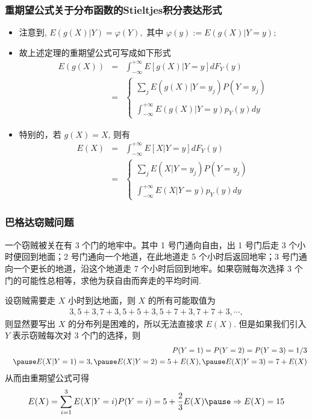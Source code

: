 \documentclass[Prob-All.tex]{subfiles}
\begin{document}
\begin{frame}
	\frametitle{重期望公式关于分布函数的Stieltjes积分表达形式}
	\begin{itemize}[<+-|alert@+>]
		\item 注意到, $E(g(X)|Y)=\varphi(Y),$ 其中 $\varphi(y):=E(g(X)|Y=y)$;
		\item 故上述定理的重期望公式可写成如下形式
		\begin{eqnarray*}
			E(g(X))&=&\int_{-\infty}^{+\infty}E[g(X)|Y=y]dF_Y(y)\\
			&=&\left\{
			\begin{array}{l}
				\sum_jE(g(X)|Y=y_j)P(Y=y_j)\\
				\\
				\int_{-\infty}^{+\infty}E(g(X)|Y=y)p_Y(y)dy
			\end{array}
			\right.
		\end{eqnarray*}
		\item 特别的，若 $g (X)=X$, 则有
		\begin{eqnarray*}
			E(X)&=&\int_{-\infty}^{+\infty}E[X|Y=y]dF_Y(y)\\
			&=&\left\{
			\begin{array}{l}
				\sum_jE(X|Y=y_j)P(Y=y_j)\\
				\\
				\int_{-\infty}^{+\infty}E(X|Y=y)p_Y(y)dy
			\end{array}
			\right.
		\end{eqnarray*}

	\end{itemize}
\end{frame}
\begin{frame}
	\frametitle{巴格达窃贼问题}
	\begin{exam}
		一个窃贼被关在有 3 个门的地牢中。其中 1 号门通向自由，出 1 号门后走 3 个小时便回到地面；2 号门通向一个地道，在此地道走 5 个小时后返回地牢；3 号门通向一个更长的地道，沿这个地道走 7 个小时后回到地牢。如果窃贼每次选择 3 个门的可能性总相等，求他为获自由而奔走的平均时间.
	\end{exam}

	\pause \jieda 设窃贼需要走 $X$ 小时到达地面，则 $X$ 的所有可能取值为
	\begin{eqnarray*}
		3, 5+3, 7+3, 5+5+3, 5+7+3, 7+7+3,\cdots,
	\end{eqnarray*}
	则显然要写出 $X$ 的分布列是困难的，所以无法直接求 $E (X)$. \pause 但是如果我们引入 $Y$ 表示窃贼每次对 3 个门的选择，则 \pause
	\begin{eqnarray*}
		&&P(Y=1)=P(Y=2)=P(Y=3)=1/3\\
		&&\pause E(X|Y=1)=3, \pause E(X|Y=2)=5+E(X), \pause E(X|Y=3)=7+E(X)
	\end{eqnarray*}
	\pause 从而由重期望公式可得
	\begin{eqnarray*}
		E(X)=\sum_{i=1}^3E(X|Y=i)P(Y=i)=5+\dfrac{2}{3}E(X)\pause \Rightarrow E(X)=15
	\end{eqnarray*}
\end{frame}
\end{document}
